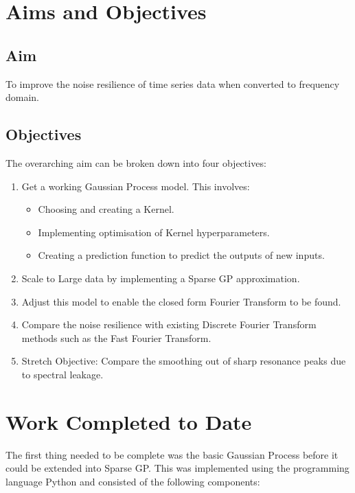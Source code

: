 \documentclass[12pt]{article}
\begin{document}
    \section{Aims and Objectives}
    \subsection{Aim}
    To improve the noise resilience of time series data when converted to frequency domain.

    \subsection{Objectives}
    The overarching aim can be broken down into four objectives:
        \begin{enumerate}
            \item Get a working Gaussian Process model.
            This involves:
                \begin{itemize}
                    \item Choosing and creating a Kernel.
                    \item Implementing optimisation of Kernel hyperparameters. \label{item:nll}
                    \item Creating a prediction function to predict the outputs of new inputs. \label{item:predict}
                \end{itemize}
            \item Scale to Large data by implementing a Sparse GP approximation.
            \item Adjust this model to enable the closed form Fourier Transform to be found.
            \item Compare the noise resilience with existing Discrete Fourier Transform methods such as the Fast Fourier Transform.\label{noise-resiliance}
            \item Stretch Objective: Compare the smoothing out of sharp resonance peaks due to spectral leakage.\label{stretch-obj}
        \end{enumerate}

    \section{Work Completed to Date}
    The first thing needed to be complete was the basic Gaussian Process before it could be extended into Sparse GP\@.
    This was implemented using the programming language Python and consisted of the following components:
\end{document}
